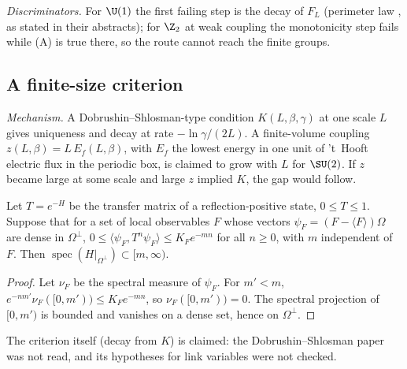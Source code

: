 \emph{Discriminators.} For $\U(1)$ the first failing step is the decay of $F_L$ (perimeter law
\cite{Guth80,FS82}, as stated in their abstracts); for $\Z_2$ at weak coupling the monotonicity
step fails while (A) is true there, so the route cannot reach the finite groups.

\subsection{A finite-size criterion}\label{neg:sub-fs}

\emph{Mechanism.} A Dobrushin--Shlosman-type condition $K(L,\beta,\gamma)$ at one scale $L$
gives uniqueness and decay at rate $-\ln\gamma/(2L)$. A finite-volume coupling
$z(L,\beta)=L\,E_f(L,\beta)$, with $E_f$ the lowest energy in one unit of 't~Hooft electric flux
in the periodic box, is claimed to grow with $L$ for $\SU(2)$. If $z$ became large at some scale
and large $z$ implied $K$, the gap would follow.

\begin{lemma}\label{neg:lem-decaygap}
Let $T=e^{-H}$ be the transfer matrix of a reflection-positive state, $0\le T\le1$. Suppose
that for a set of local observables $F$ whose vectors $\psi_F=(F-\langle F\rangle)\Omega$ are
dense in $\Omega^\perp$, $0\le\langle\psi_F,T^n\psi_F\rangle\le K_Fe^{-mn}$ for all $n\ge0$, with
$m$ independent of $F$. Then $\operatorname{spec}(H|_{\Omega^\perp})\subset[m,\infty)$.
\end{lemma}

\begin{proof}
Let $\nu_F$ be the spectral measure of $\psi_F$. For $m'<m$,
$e^{-nm'}\nu_F([0,m'))\le K_Fe^{-mn}$, so $\nu_F([0,m'))=0$. The spectral projection of
$[0,m')$ is bounded and vanishes on a dense set, hence on $\Omega^\perp$.
\end{proof}

The criterion itself (decay from $K$) is claimed: the Dobrushin--Shlosman paper was not read,
and its hypotheses for link variables were not checked.

